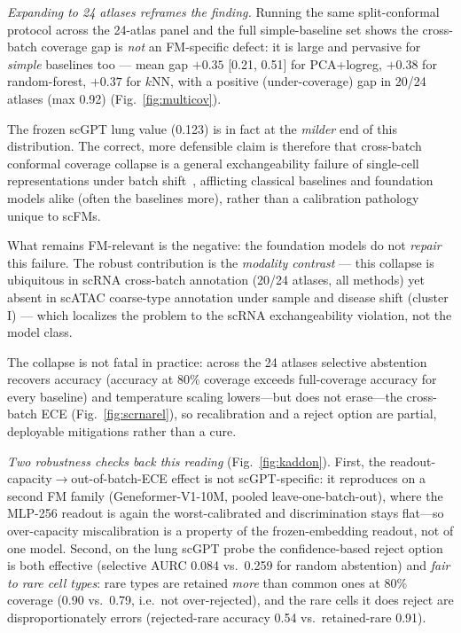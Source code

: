 \documentclass[11pt]{article}
\begin{document}
\emph{Expanding to 24 atlases reframes the finding.} Running the same split-conformal protocol across the 24-atlas panel and the full simple-baseline set shows the cross-batch coverage gap is \emph{not} an FM-specific defect: it is large and pervasive for \emph{simple} baselines too --- mean gap $+0.35$ [0.21, 0.51] for PCA+logreg, $+0.38$ for random-forest, $+0.37$ for $k$NN, with a positive (under-coverage) gap in 20/24 atlases (max 0.92) (Fig.~\ref{fig:multicov}).

The frozen scGPT lung value (0.123) is in fact at the \emph{milder} end of this distribution. The correct, more defensible claim is therefore that cross-batch conformal coverage collapse is a general exchangeability failure of single-cell representations under batch shift~\cite{barber2023}, afflicting classical baselines and foundation models alike (often the baselines more), rather than a calibration pathology unique to scFMs.

What remains FM-relevant is the negative: the foundation models do not \emph{repair} this failure. The robust contribution is the \emph{modality contrast} --- this collapse is ubiquitous in scRNA cross-batch annotation (20/24 atlases, all methods) yet absent in scATAC coarse-type annotation under sample and disease shift (cluster I) --- which localizes the problem to the scRNA exchangeability violation, not the model class.

The collapse is not fatal in practice: across the 24 atlases selective abstention recovers accuracy (accuracy at 80\% coverage exceeds full-coverage accuracy for every baseline) and temperature scaling lowers---but does not erase---the cross-batch ECE (Fig.~\ref{fig:scrnarel}), so recalibration and a reject option are partial, deployable mitigations rather than a cure.

\emph{Two robustness checks back this reading} (Fig.~\ref{fig:kaddon}). First, the readout-capacity$\to$out-of-batch-ECE effect is not scGPT-specific: it reproduces on a second FM family (Geneformer-V1-10M, pooled leave-one-batch-out), where the MLP-256 readout is again the worst-calibrated and discrimination stays flat---so over-capacity miscalibration is a property of the frozen-embedding readout, not of one model. Second, on the lung scGPT probe the confidence-based reject option is both effective (selective AURC 0.084 vs.\ 0.259 for random abstention) and \emph{fair to rare cell types}: rare types are retained \emph{more} than common ones at 80\% coverage (0.90 vs.\ 0.79, i.e.\ not over-rejected), and the rare cells it does reject are disproportionately errors (rejected-rare accuracy 0.54 vs.\ retained-rare 0.91).
\end{document}

